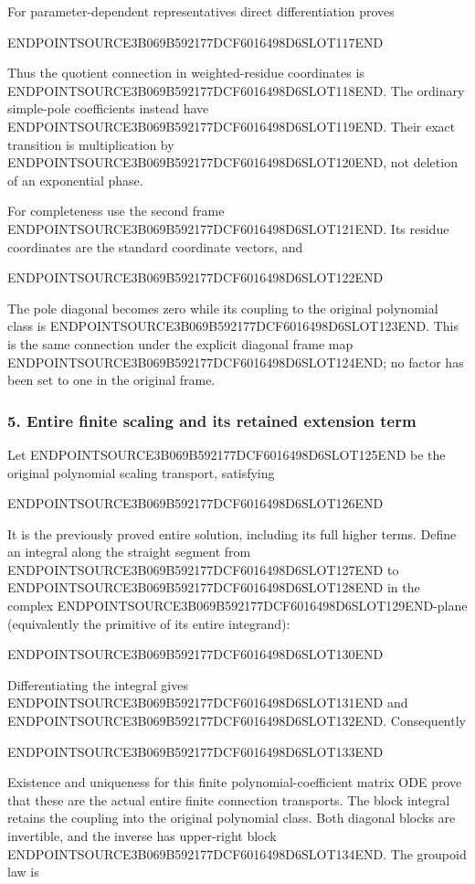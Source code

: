 For parameter-dependent representatives direct differentiation proves

ENDPOINTSOURCE3B069B592177DCF6016498D6SLOT117END

Thus the quotient connection in weighted-residue coordinates is ENDPOINTSOURCE3B069B592177DCF6016498D6SLOT118END. The ordinary simple-pole coefficients instead have ENDPOINTSOURCE3B069B592177DCF6016498D6SLOT119END. Their exact transition is multiplication by ENDPOINTSOURCE3B069B592177DCF6016498D6SLOT120END, not deletion of an exponential phase.

For completeness use the second frame ENDPOINTSOURCE3B069B592177DCF6016498D6SLOT121END. Its residue coordinates are the standard coordinate vectors, and

ENDPOINTSOURCE3B069B592177DCF6016498D6SLOT122END

The pole diagonal becomes zero while its coupling to the original polynomial class is ENDPOINTSOURCE3B069B592177DCF6016498D6SLOT123END. This is the same connection under the explicit diagonal frame map ENDPOINTSOURCE3B069B592177DCF6016498D6SLOT124END; no factor has been set to one in the original frame.

\subsubsection{5. Entire finite scaling and its retained extension term}\label{endpoint-analytic_pole--entire-finite-scaling-and-its-retained-extension-term}

Let ENDPOINTSOURCE3B069B592177DCF6016498D6SLOT125END be the original polynomial scaling transport, satisfying

ENDPOINTSOURCE3B069B592177DCF6016498D6SLOT126END

It is the previously proved entire solution, including its full higher terms. Define an integral along the straight segment from ENDPOINTSOURCE3B069B592177DCF6016498D6SLOT127END to ENDPOINTSOURCE3B069B592177DCF6016498D6SLOT128END in the complex ENDPOINTSOURCE3B069B592177DCF6016498D6SLOT129END-plane (equivalently the primitive of its entire integrand):

ENDPOINTSOURCE3B069B592177DCF6016498D6SLOT130END

Differentiating the integral gives ENDPOINTSOURCE3B069B592177DCF6016498D6SLOT131END and ENDPOINTSOURCE3B069B592177DCF6016498D6SLOT132END. Consequently

ENDPOINTSOURCE3B069B592177DCF6016498D6SLOT133END

Existence and uniqueness for this finite polynomial-coefficient matrix ODE prove that these are the actual entire finite connection transports. The block integral retains the coupling into the original polynomial class. Both diagonal blocks are invertible, and the inverse has upper-right block ENDPOINTSOURCE3B069B592177DCF6016498D6SLOT134END. The groupoid law is

